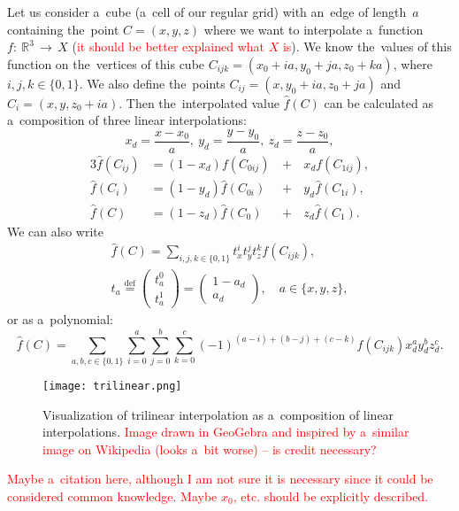 				Let us consider a~cube (a~cell of our regular grid) with an~edge of length~$a$ containing the~point $C = (x,y,z)$ where we want to interpolate a~function $f\!\!:~\!\!\mathbb{R}^3\,\to\,X$ (\textcolor{red}{it should be better explained what $X$ is}). We know the~values of this function on the~vertices of this cube $C_{ijk} = (x_0+ia,y_0+ja,z_0+ka)$, where $i,j,k \in \{0,1\}$. We also define the~points $C_{ij} = (x,y_0+ia,z_0+ja)$ and $C_i=(x,y,z_0+ia)$. Then the~interpolated value $\widehat{f}(C)$ can be calculated as a~composition of three linear interpolations:
					\begin{equation}
						x_d = \frac{x-x_0}{a},~y_d = \frac{y-y_0}{a},~z_d = \frac{z-z_0}{a},
					\end{equation}
					\begin{alignat}{3}
						\widehat{f}(C_{ij}) &= (1-x_d)f(C_{0ij}) \,&+&\,x_d f(C_{1ij}),\\
						\widehat{f}(C_{i}) &= (1-y_d)\widehat{f}(C_{0i}) &+&\,y_d \widehat{f}(C_{1i}),\\
						\widehat{f}(C) &= (1-z_d)\widehat{f}(C_0) &+&\,z_d \widehat{f}(C_1).
					\end{alignat}
				We can also write
					\begin{eqnarray}
						\widehat{f}(C) = \sum_{i,j,k \in \{0,1\}} t_x^i t_y^j t_z^k f(C_{ijk}),\\
						t_a \stackrel{\text{def}}{=} \begin{pmatrix}t_a^0\\ t_a^1\end{pmatrix} = \begin{pmatrix}1-a_d\\ a_d\end{pmatrix},\quad a \in \{x,y,z\},
					\end{eqnarray}
				or as a~polynomial:
					\begin{equation}
						\label{eq:trilinpoly}
						\widehat{f}(C) = \sum_{a,b,c \in \{0,1\}}\sum^{a}_{i=0}\sum^{b}_{j=0}\sum^{c}_{k=0} (-1)^{(a-i)+(b-j)+(c-k)} f(C_{ijk}) x_d^a y_d^b z_d^c.
					\end{equation}
				
				\begin{figure}[H]
					\centering
					\texttt{[image: trilinear.png]}
					\label{fig:trilin}
					\caption{Visualization of trilinear interpolation as a~composition of linear interpolations. \textcolor{red}{Image drawn in GeoGebra and inspired by a~similar image on Wikipedia (looks a~bit worse) -- is credit necessary?}}
				\end{figure}
				
				\textcolor{red}{Maybe a~citation here, although I am not sure it is necessary since it could be considered common knowledge. Maybe $x_0$, etc. should be explicitly described.}